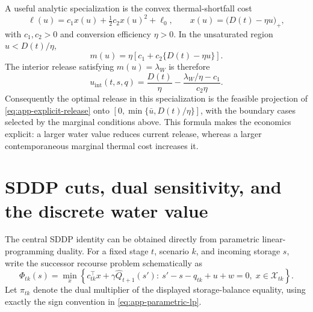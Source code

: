 \documentclass[11pt,a4paper]{article}
\begin{document}
A useful analytic specialization is the convex thermal-shortfall cost
\begin{equation}
 \ell(u)=c_1x(u)+\tfrac12c_2x(u)^2+\ell_0,\qquad
 x(u)=\big(D(t)-\eta u\big)_+,
 \label{eq:app-quadratic-cost}
\end{equation}
with $c_1,c_2>0$ and conversion efficiency $\eta>0$. In the unsaturated region
$u<D(t)/\eta$,
\begin{equation}
 m(u)=\eta\left[c_1+c_2\{D(t)-\eta u\}\right].
 \label{eq:app-marginal-cost}
\end{equation}
The interior release satisfying $m(u)=\lambda_W$ is therefore
\begin{equation}
 u_{\mathrm{int}}(t,s,q)=
 \frac{D(t)}{\eta}
 -\frac{\lambda_W/\eta-c_1}{c_2\eta}.
 \label{eq:app-explicit-release}
\end{equation}
Consequently the optimal release in this specialization is the feasible projection
of \eqref{eq:app-explicit-release} onto
$[0,\min\{\bar u,D(t)/\eta\}]$, with the boundary cases selected by the marginal
conditions above. This formula makes the economics explicit: a larger water value
reduces current release, whereas a larger contemporaneous marginal thermal cost
increases it.

\section{SDDP cuts, dual sensitivity, and the discrete water value}
\label{app:sddp}
The central SDDP identity can be obtained directly from parametric linear-programming
duality. For a fixed stage $t$, scenario $k$, and incoming storage $s$, write the
successor recourse problem schematically as
\begin{equation}
 \Phi_{tk}(s)=\min_{x}\left\{c_{tk}^{\top}x
 +\gamma\widehat Q_{t+1}(s'):\
 s'-s-q_{tk}+u+w=0,\;x\in\mathcal X_{tk}\right\}.
 \label{eq:app-parametric-lp}
\end{equation}
Let $\pi_{tk}$ denote the dual multiplier of the displayed storage-balance equality,
using exactly the sign convention in \eqref{eq:app-parametric-lp}.
\end{document}
